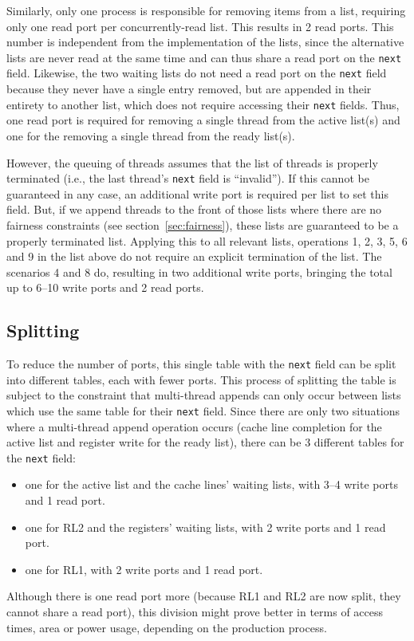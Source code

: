 Similarly, only one process is responsible for removing items from a list, requiring only one read port per concurrently-read list. This results in 2 read ports. This number is independent from the implementation of the lists, since the alternative lists are never read at the same time and can thus share a read port on the {\tt next} field. Likewise, the two waiting lists do not need a read port on the {\tt next} field because they never have a single entry removed, but are appended in their entirety to another list, which does not require accessing their {\tt next} fields. Thus, one read port is required for removing a single thread from the active list(s) and one for the removing a single thread from the ready list(s).

However, the queuing of threads assumes that the list of threads is properly terminated (i.e., the last thread's {\tt next} field is ``invalid''). If this cannot be guaranteed in any case, an additional write port is required per list to set this field. But, if we append threads to the front of those lists where there are no fairness constraints (see section~\ref{sec:fairness}), these lists are guaranteed to be a properly terminated list. Applying this to all relevant lists, operations 1, 2, 3, 5, 6 and 9 in the list above do not require an explicit termination of the list. The scenarios 4 and 8 do, resulting in two additional write ports, bringing the total up to 6--10 write ports and 2 read ports.

\subsection{Splitting}
To reduce the number of ports, this single table with the {\tt next} field can be split into different tables, each with fewer ports. This process of splitting the table is subject to the constraint that multi-thread appends can only occur between lists which use the same table for their {\tt next} field. Since there are only two situations where a multi-thread append operation occurs (cache line completion for the active list and register write for the ready list), there can be 3 different tables for the {\tt next} field:
\begin{itemize}
\item one for the active list and the cache lines' waiting lists, with 3--4 write ports and 1 read port.
\item one for RL2 and the registers' waiting lists, with 2 write ports and 1 read port.
\item one for RL1, with 2 write ports and 1 read port.
\end{itemize}
Although there is one read port more (because RL1 and RL2 are now split, they cannot share a read port), this division might prove better in terms of access times, area or power usage, depending on the production process.

